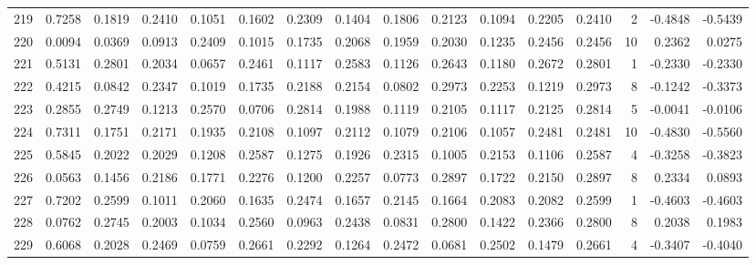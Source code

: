 \begin{tabular}{lrrrrrrrrrrrrrrr}
219 &      0.7258 &  0.1819 &  0.2410 &  0.1051 &  0.1602 &  0.2309 &  0.1404 &  0.1806 &  0.2123 &  0.1094 &   0.2205 &     0.2410 &      2 &                   -0.4848 &                    -0.5439 \\
220 &      0.0094 &  0.0369 &  0.0913 &  0.2409 &  0.1015 &  0.1735 &  0.2068 &  0.1959 &  0.2030 &  0.1235 &   0.2456 &     0.2456 &     10 &                    0.2362 &                     0.0275 \\
221 &      0.5131 &  0.2801 &  0.2034 &  0.0657 &  0.2461 &  0.1117 &  0.2583 &  0.1126 &  0.2643 &  0.1180 &   0.2672 &     0.2801 &      1 &                   -0.2330 &                    -0.2330 \\
222 &      0.4215 &  0.0842 &  0.2347 &  0.1019 &  0.1735 &  0.2188 &  0.2154 &  0.0802 &  0.2973 &  0.2253 &   0.1219 &     0.2973 &      8 &                   -0.1242 &                    -0.3373 \\
223 &      0.2855 &  0.2749 &  0.1213 &  0.2570 &  0.0706 &  0.2814 &  0.1988 &  0.1119 &  0.2105 &  0.1117 &   0.2125 &     0.2814 &      5 &                   -0.0041 &                    -0.0106 \\
224 &      0.7311 &  0.1751 &  0.2171 &  0.1935 &  0.2108 &  0.1097 &  0.2112 &  0.1079 &  0.2106 &  0.1057 &   0.2481 &     0.2481 &     10 &                   -0.4830 &                    -0.5560 \\
225 &      0.5845 &  0.2022 &  0.2029 &  0.1208 &  0.2587 &  0.1275 &  0.1926 &  0.2315 &  0.1005 &  0.2153 &   0.1106 &     0.2587 &      4 &                   -0.3258 &                    -0.3823 \\
226 &      0.0563 &  0.1456 &  0.2186 &  0.1771 &  0.2276 &  0.1200 &  0.2257 &  0.0773 &  0.2897 &  0.1722 &   0.2150 &     0.2897 &      8 &                    0.2334 &                     0.0893 \\
227 &      0.7202 &  0.2599 &  0.1011 &  0.2060 &  0.1635 &  0.2474 &  0.1657 &  0.2145 &  0.1664 &  0.2083 &   0.2082 &     0.2599 &      1 &                   -0.4603 &                    -0.4603 \\
228 &      0.0762 &  0.2745 &  0.2003 &  0.1034 &  0.2560 &  0.0963 &  0.2438 &  0.0831 &  0.2800 &  0.1422 &   0.2366 &     0.2800 &      8 &                    0.2038 &                     0.1983 \\
229 &      0.6068 &  0.2028 &  0.2469 &  0.0759 &  0.2661 &  0.2292 &  0.1264 &  0.2472 &  0.0681 &  0.2502 &   0.1479 &     0.2661 &      4 &                   -0.3407 &                    -0.4040 \\

\end{tabular}
